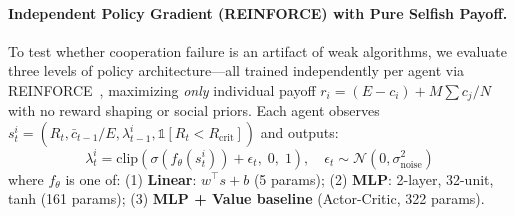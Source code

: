 \documentclass{article}
\begin{document}
\paragraph{Independent Policy Gradient (REINFORCE) with Pure Selfish Payoff.}
To test whether cooperation failure is an artifact of weak algorithms, we evaluate three levels of policy architecture---all trained independently per agent via REINFORCE~\citep{williams1992simple}, maximizing \emph{only} individual payoff $r_i = (E - c_i) + M\sum c_j / N$ with no reward shaping or social priors.
Each agent observes $s_t^i = (R_t, \bar{c}_{t-1}/E, \lambda_{t-1}^i, \mathbb{1}[R_t < R_{\text{crit}}])$ and outputs:
\begin{equation}
\lambda_t^i = \text{clip}\!\left(\sigma(f_\theta(s_t^i)) + \epsilon_t,\; 0,\; 1\right), \quad \epsilon_t \sim \mathcal{N}(0, \sigma_{\text{noise}}^2)
\end{equation}
where $f_\theta$ is one of: (1) \textbf{Linear}: $w^\top s + b$ (5 params); (2) \textbf{MLP}: 2-layer, 32-unit, tanh (161 params); (3) \textbf{MLP + Value baseline} (Actor-Critic, 322 params).
\end{document}
